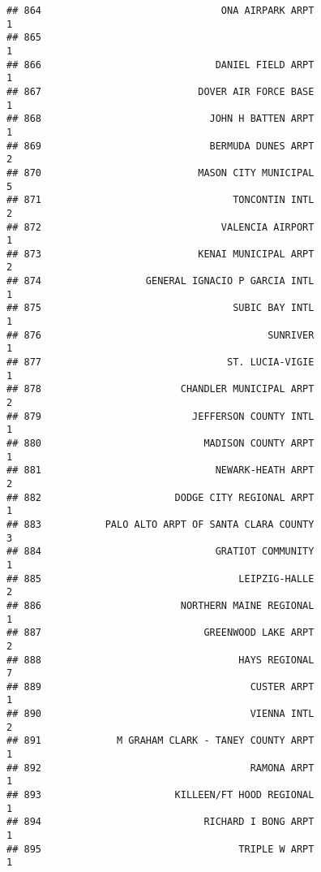 \documentclass[
]{article}
\begin{document}
\begin{verbatim}
## 864                               ONA AIRPARK ARPT                           1
## 865                                                                          1
## 866                              DANIEL FIELD ARPT                           1
## 867                           DOVER AIR FORCE BASE                           1
## 868                             JOHN H BATTEN ARPT                           1
## 869                             BERMUDA DUNES ARPT                           2
## 870                           MASON CITY MUNICIPAL                           5
## 871                                 TONCONTIN INTL                           2
## 872                               VALENCIA AIRPORT                           1
## 873                           KENAI MUNICIPAL ARPT                           2
## 874                  GENERAL IGNACIO P GARCIA INTL                           1
## 875                                 SUBIC BAY INTL                           1
## 876                                       SUNRIVER                           1
## 877                                ST. LUCIA-VIGIE                           1
## 878                        CHANDLER MUNICIPAL ARPT                           2
## 879                          JEFFERSON COUNTY INTL                           1
## 880                            MADISON COUNTY ARPT                           1
## 881                              NEWARK-HEATH ARPT                           2
## 882                       DODGE CITY REGIONAL ARPT                           1
## 883           PALO ALTO ARPT OF SANTA CLARA COUNTY                           3
## 884                              GRATIOT COMMUNITY                           1
## 885                                  LEIPZIG-HALLE                           2
## 886                        NORTHERN MAINE REGIONAL                           1
## 887                            GREENWOOD LAKE ARPT                           2
## 888                                  HAYS REGIONAL                           7
## 889                                    CUSTER ARPT                           1
## 890                                    VIENNA INTL                           2
## 891             M GRAHAM CLARK - TANEY COUNTY ARPT                           1
## 892                                    RAMONA ARPT                           1
## 893                       KILLEEN/FT HOOD REGIONAL                           1
## 894                            RICHARD I BONG ARPT                           1
## 895                                  TRIPLE W ARPT                           1

\end{verbatim}
\end{document}
